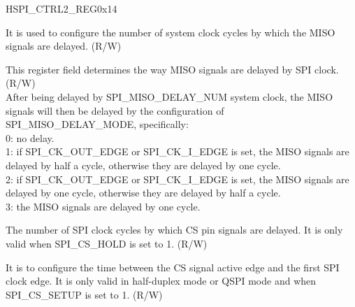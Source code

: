 \begin{register}{H}{SPI\_CTRL2\_REG}{0x14}
\begin{regdesc}
\begin{reglist}
\item [SPI\_MISO\_DELAY\_NUM] It is used to configure the number of system clock cycles by which the MISO signals are delayed. (R/W)
\item [SPI\_MISO\_DELAY\_MODE] This register field determines the way MISO signals are delayed by SPI clock. (R/W) \\
After being delayed by SPI\_MISO\_DELAY\_NUM system clock, the MISO signals will then be delayed by the configuration of SPI\_MISO\_DELAY\_MODE, specifically:\\
0: no delay. \\
1: if SPI\_CK\_OUT\_EDGE or SPI\_CK\_I\_EDGE is set, the MISO signals are delayed by half a cycle, otherwise they are delayed by one cycle. \\
2: if SPI\_CK\_OUT\_EDGE or SPI\_CK\_I\_EDGE is set, the MISO signals are delayed by one cycle, otherwise they are delayed by half a cycle. \\
3: the MISO signals are delayed by one cycle.
\item [SPI\_HOLD\_TIME]The number of SPI clock cycles by which CS pin signals are delayed. It is only valid when SPI\_CS\_HOLD is set to 1. (R/W)
\item [SPI\_SETUP\_TIME] It is to configure the time between the CS signal active edge and the first SPI clock edge. It is only valid in half-duplex mode or QSPI mode and when SPI\_CS\_SETUP is set to 1. (R/W)
\end{reglist}\end{regdesc}
\end{register}


